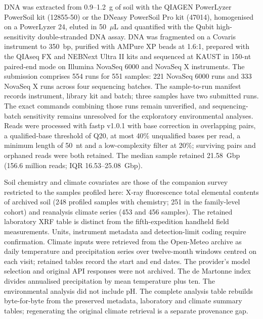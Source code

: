 \documentclass[11pt]{article}
\begin{document}
DNA was extracted from 0.9--1.2~g of soil with the QIAGEN PowerLyzer PowerSoil kit (12855-50) or the
DNeasy PowerSoil Pro kit (47014), homogenised on a PowerLyzer 24, eluted in 50~$\mu$L and quantified
with the Qubit high-sensitivity double-stranded DNA assay. DNA was fragmented on a Covaris instrument
to 350~bp, purified with AMPure XP beads at 1.6:1, prepared with the QIAseq FX and NEBNext Ultra II
kits and sequenced at KAUST in 150-nt paired-end mode on Illumina NovaSeq 6000 and NovaSeq X instruments.
The submission comprises 554 runs for 551 samples: 221 NovaSeq 6000 runs and 333 NovaSeq X runs
across four sequencing batches. The sample-to-run manifest records instrument, library kit and
batch; three samples have two submitted runs. The exact commands combining those runs remain unverified, and sequencing-batch sensitivity remains unresolved for the exploratory environmental analyses. Reads were
processed with fastp v1.0.1 \citep{chen2018fastp} with base correction in overlapping pairs, a
qualified-base threshold of Q20, at most 40\% unqualified bases per read, a minimum length of 50~nt
and a low-complexity filter at 20\%; surviving pairs and orphaned reads were both retained. The
median sample retained 21.58~Gbp (156.6 million reads; IQR 16.53--25.08~Gbp).

Soil chemistry and climate covariates are those of the companion survey restricted to the samples
profiled here: X-ray fluorescence total elemental contents of archived soil (248 profiled samples
with chemistry; 251 in the family-level cohort) and reanalysis climate series (453 and 456 samples).
The retained laboratory XRF table is distinct from the fifth-expedition handheld field measurements.
Units, instrument metadata and detection-limit coding require confirmation. Climate inputs were
retrieved from the Open-Meteo archive as daily temperature and precipitation series over twelve-month
windows centred on each visit; retained tables record the start and end dates. The provider's model
selection and original API responses were not archived. The de Martonne index divides annualised
precipitation by mean temperature plus ten. The environmental analysis did not include pH.
The complete analysis table rebuilds byte-for-byte from the preserved metadata, laboratory and
climate summary tables; regenerating the original climate retrieval is a separate provenance gap.
\end{document}
